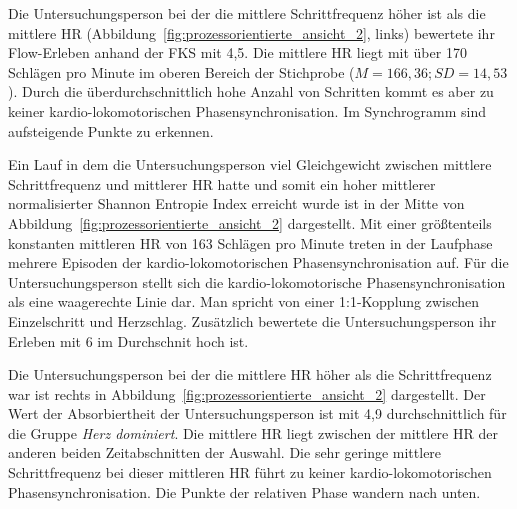 Die Untersuchungsperson bei der die mittlere Schrittfrequenz höher ist als die mittlere \ac{HR} (Abbildung~\ref{fig:prozessorientierte_ansicht_2}, links) bewertete ihr Flow-Erleben anhand der \ac{FKS} mit 4,5. Die mittlere \ac{HR} liegt mit über 170 Schlägen pro Minute im oberen Bereich der Stichprobe ($M = 166{,}36; SD = 14{,}53$). Durch die überdurchschnittlich hohe Anzahl von Schritten kommt es aber zu keiner kardio-lokomotorischen Phasensynchronisation. Im Synchrogramm sind aufsteigende Punkte zu erkennen.

\begin{sidewaysfigure}
	
	\caption{Eine Minute Daten einer Untersuchungsperson der Gruppe Schritt dominiert (links), einer Untersuchungsperson Geleichgewicht (mitte) und einer Untersuchungsperson der Gruppe Herz dominert (rechts). \emph{Anmerkung}: Rel. Phase = Relative Phase.}
	\label{fig:prozessorientierte_ansicht_2}
\end{sidewaysfigure}

Ein Lauf in dem die Untersuchungsperson viel Gleichgewicht zwischen mittlere Schrittfrequenz und mittlerer HR hatte und somit ein hoher mittlerer normalisierter Shannon Entropie Index erreicht wurde ist in der Mitte von Abbildung~\ref{fig:prozessorientierte_ansicht_2} dargestellt. Mit einer größtenteils konstanten mittleren \ac{HR} von 163 Schlägen pro Minute treten in der Laufphase mehrere Episoden der kardio-lokomotorischen Phasensynchronisation auf. Für die Untersuchungsperson stellt sich die kardio-lokomotorische Phasensynchronisation als eine waagerechte Linie dar. Man spricht von einer 1:1-Kopplung zwischen Einzelschritt und Herzschlag. Zusätzlich bewertete die Untersuchungsperson ihr Erleben mit 6 im Durchschnit hoch ist. 

Die Untersuchungsperson bei der die mittlere \ac{HR} höher als die Schrittfrequenz war ist rechts in Abbildung~\ref{fig:prozessorientierte_ansicht_2} dargestellt. Der Wert der Absorbiertheit der Untersuchungsperson ist mit 4,9 durchschnittlich für die Gruppe \emph{Herz dominiert}. Die mittlere \ac{HR} liegt zwischen der mittlere \ac{HR} der anderen beiden Zeitabschnitten der Auswahl. Die sehr geringe mittlere Schrittfrequenz bei dieser mittleren \ac{HR} führt zu keiner kardio-lokomotorischen Phasensynchronisation. Die Punkte der relativen Phase wandern nach unten. 




